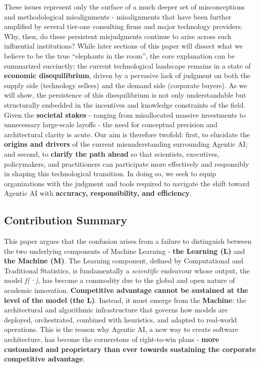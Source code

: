 \documentclass{article}
\begin{document}
These issues represent only the surface of a much deeper set of misconceptions and methodological misalignments - misalignments that have been further amplified by several tier-one consulting firms and major technology providers. Why, then, do these persistent misjudgments continue to arise across such influential institutions? While later sections of this paper will dissect what we believe to be the true “elephants in the room”, the core explanation can be summarized succinctly: the current technological landscape remains in a state of \textbf{economic disequilibrium}, driven by a pervasive lack of judgment on both the supply side (technology sellers) and the demand side (corporate buyers). As we will show, the persistence of this disequilibrium is not only understandable but structurally embedded in the incentives and knowledge constraints of the field. \\


Given the \textbf{societal stakes} - ranging from misallocated massive investments to unnecessary large-scale layoffs - the need for conceptual precision and architectural clarity is acute. Our aim is therefore twofold: first, to elucidate the \textbf{origins and drivers} of the current misunderstanding surrounding Agentic AI; and second, to \textbf{clarify the path ahead} so that scientists, executives, policymakers, and practitioners can participate more effectively and responsibly in shaping this technological transition. In doing so, we seek to equip organizations with the judgment and tools required to navigate the shift toward Agentic AI with \textbf{accuracy, responsibility, and efficiency}.\\


\subsection{Contribution Summary}
\label{subsection: Contribution Summary}

This paper argues that the confusion arises from a failure to distinguish between the two underlying components of Machine Learning - \textbf{the Learning (L)} and \textbf{the Machine (M)}. The Learning component, defined by Computational and Traditional Statistics, is fundamentally a \textit{scientific} endeavour whose output, the model \textit{f(·)}, has become a commodity due to the global and open nature of academic innovation. \textbf{Competitive advantage cannot be sustained at the level of the model (the L)}. Instead, it must emerge from the \textbf{Machine}: the architectural and algorithmic infrastructure that governs how models are deployed, orchestrated, combined with heuristics, and adapted to real-world operations. This is the reason why Agentic AI, a new way to create software architecture, has become the cornerstone of right-to-win plans - \textbf{more customized and proprietary than ever towards sustaining the corporate competitive advantage}.\\
\end{document}
